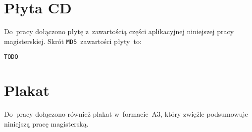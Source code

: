 \documentclass[thesis]{subfiles}
\begin{document}

\begin{appendices}

\chapter{Płyta CD}

Do~pracy dołączono płytę z~zawartością części aplikacyjnej niniejszej pracy magisterskiej. Skrót \texttt{MD5}~zawartości płyty~to:
\begin{center}
\texttt{TODO}
\end{center}

\chapter{Plakat}
Do~pracy dołączono również plakat w~formacie~A3, który zwięźle podsumowuje niniejszą pracę magisterską.

\end{appendices}
\end{document}
